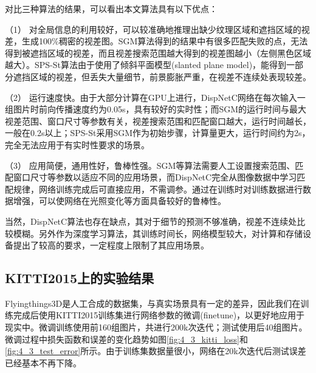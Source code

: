 对比三种算法的结果，可以看出本文算法具有以下优点：

（1）
对全局信息的利用较好，可以较准确地推理出缺少纹理区域和遮挡区域的视差，生成100\%稠密的视差图。SGM算法得到的结果中有很多匹配失败的点，无法得到被遮挡区域的视差，而且视差搜索范围越大得到的视差图越小（左侧黑色区域越大）。SPS-St算法由于使用了倾斜平面模型(slanted plane model)，能得到一部分遮挡区域的视差，但丢失大量细节，前景膨胀严重，在视差不连续处表现较差。

（2）
运行速度快。由于大部分计算在GPU上进行，DispNetC网络在每次输入一组图片时前向传播速度约为0.05s，具有较好的实时性；而SGM的运行时间与最大视差范围、窗口尺寸等参数有关，视差搜索范围和匹配窗口越大，运行时间越长，一般在0.2s以上；SPS-St采用SGM作为初始步骤，计算量更大，运行时间约为2s，完全无法应用于有实时性要求的场景。

（3）
应用简便，通用性好，鲁棒性强。SGM等算法需要人工设置搜索范围、匹配窗口尺寸等参数以适应不同的应用场景，而DispNetC完全从图像数据中学习匹配规律，网络训练完成后可直接应用，不需调参。通过在训练时对训练数据进行数据增强，可以使网络在光照变化等方面具备较好的鲁棒性。

当然，DispNetC算法也存在缺点，其对于细节的预测不够准确，视差不连续处比较模糊。另外作为深度学习算法，其训练时间长，网络模型较大，对计算和存储设备提出了较高的要求，一定程度上限制了其应用场景。

\subsection{KITTI2015上的实验结果}
Flyingthings3D是人工合成的数据集，与真实场景具有一定的差异，因此我们在训练完成后使用KITTI2015训练集进行网络参数的微调(finetune)，以更好地应用于现实中。微调训练使用前160组图片，共进行200k次迭代；测试使用后40组图片。微调过程中损失函数和误差的变化趋势如图\ref{fig:4_3_kitti_loss}和\ref{fig:4_3_test_error}所示。由于训练集数据量很小，网络在20k次迭代后测试误差已经基本不再下降。

